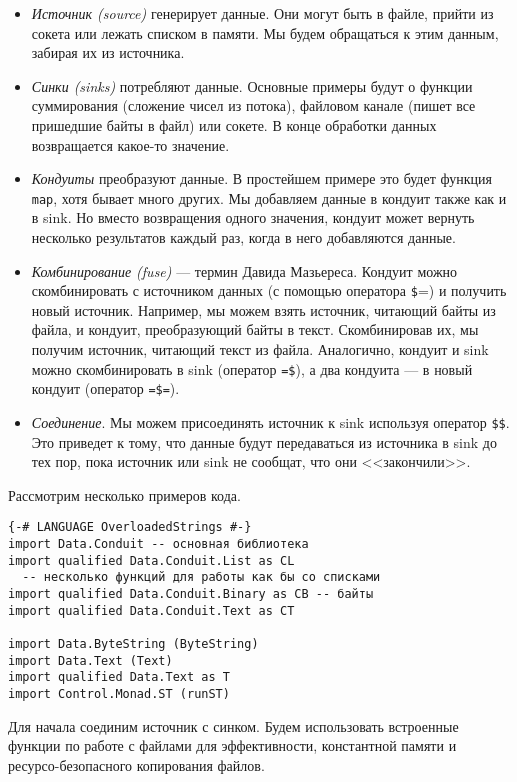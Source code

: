 \begin{itemize}
 \item \emph{Источник (source)} генерирует данные. Они могут быть в файле, прийти из
сокета или лежать списком в памяти. Мы будем обращаться к этим данным, забирая их из
источника.
 \item \emph{Синки (sinks)} потребляют данные. 
 Основные примеры будут о функции суммирования
(сложение чисел из потока), файловом канале (пишет все пришедшие байты в файл) или
сокете. В конце обработки данных возвращается какое-то значение.
 \item \emph{Кондуиты} преобразуют данные. В простейшем примере это будет функция
\lstinline=map=,
хотя бывает много других. Мы добавляем данные в кондуит также как и в sink. Но вместо
возвращения одного значения, кондуит может вернуть несколько результатов каждый раз,
когда в него добавляются данные.
  \item \emph{Комбинирование (fuse)} --- термин Давида Мазьереса. Кондуит можно 
скомбинировать с источником данных (с помощью оператора \lstinline=$==) и получить
новый источник. Например, мы можем взять источник, читающий байты из файла, и
кондуит, преобразующий байты в текст. Скомбинировав их, мы получим 
источник, читающий текст из файла. Аналогично, кондуит и sink можно скомбинировать в sink
(оператор \verb#=$#), а два кондуита --- в новый кондуит (оператор \verb#=$=#).
  \item \emph{Соединение}. Мы можем присоединять источник к sink используя оператор
\verb=$$=.
Это приведет к тому, что данные будут передаваться из источника в sink до тех пор, пока
источник или sink не сообщат, что они <<закончили>>.
\end{itemize}

Рассмотрим несколько примеров кода.
\begin{lstlisting}
{-# LANGUAGE OverloadedStrings #-}
import Data.Conduit -- основная библиотека
import qualified Data.Conduit.List as CL 
  -- несколько функций для работы как бы со списками
import qualified Data.Conduit.Binary as CB -- байты
import qualified Data.Conduit.Text as CT

import Data.ByteString (ByteString)
import Data.Text (Text)
import qualified Data.Text as T
import Control.Monad.ST (runST)
\end{lstlisting}
Для начала соединим источник с синком. Будем использовать встроенные 
функции по работе с файлами для эффективности, константной памяти и ресурсо-безопасного
копирования файлов.

